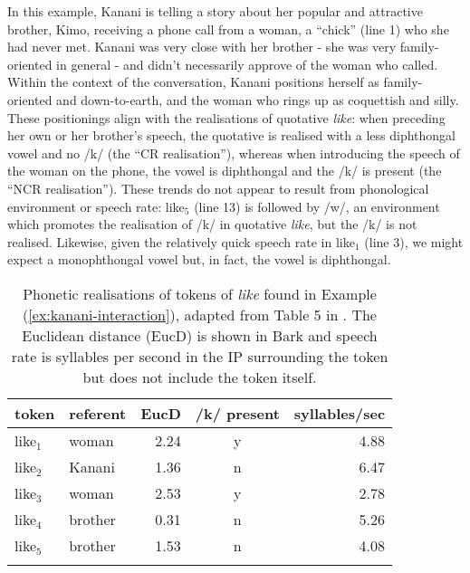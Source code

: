 \noindent In this example, Kanani is telling a story about her popular and attractive brother, Kimo, receiving a phone call from a woman, a ``chick'' (line 1) who she had never met.  Kanani was very close with her brother - she was very family-oriented in general - and didn't necessarily approve of the woman who called.  Within the context of the conversation, Kanani positions herself as family-oriented and down-to-earth, and the woman who rings up as coquettish and silly.  These positionings align with the realisations of quotative \textit{like}: when preceding her own or her brother's speech, the quotative is realised with a less diphthongal vowel and no /k/ (the ``CR realisation''), whereas when introducing the speech of the woman on the phone, the vowel is diphthongal and the /k/ is present (the ``NCR realisation''). These trends do not appear to result from phonological environment or speech rate: like$_5$ (line 13) is followed by /w/, an environment which promotes the realisation of /k/ in quotative \textit{like}, but the /k/ is not realised.  Likewise, given the relatively quick speech rate in like$_1$ (line 3), we might expect a monophthongal vowel but, in fact, the vowel is diphthongal.

\begin{table}[htbp]
\caption{Phonetic realisations of tokens of \textit{like} found in Example (\ref{ex:kanani-interaction}), adapted from Table 5 in \citet{drager2016}.  The Euclidean distance (EucD) is shown in Bark and speech rate is syllables per second in the IP surrounding the token but does not include the token itself.}	
	\label{tab:kanani-interaction}
	 \begin{center}
		\begin{tabular}{llrcr}\lsptoprule
	
   token & referent & EucD & /k/ present & syllables/sec\\
  \midrule
like$_1$ & woman & 2.24 & y & 4.88 \\
like$_2$ & Kanani & 1.36 & n & 6.47 \\
like$_3$ & woman & 2.53 & y & 2.78 \\
like$_4$ & brother & 0.31 & n & 5.26 \\
like$_5$ & brother & 1.53 & n & 4.08 \\

\lspbottomrule
		\end{tabular}
	
	\end{center}
\end{table} 

